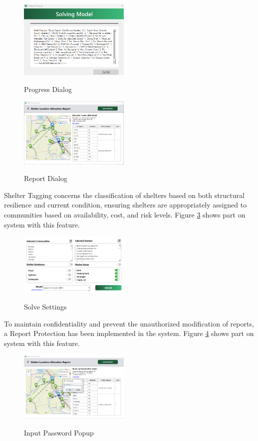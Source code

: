 \documentclass[12pt,a4paper,]{article}
\begin{document}
	\begin{figure}[h!]
		\caption{Progress Dialog}
		\centering
		\includegraphics[width=200px]{Chapter 4/progress}
		\label{solveProg}
	\end{figure}
	
	\begin{figure}[h!]
		\caption{Report Dialog}
		\centering
		\includegraphics[width=200px]{Chapter 4/alloc report}
		\label{shelAllocRep}
	\end{figure}
	
	Shelter Tagging concerns the classification of shelters based on both structural resilience and current condition, ensuring shelters are appropriately assigned to communities based on availability, cost, and risk levels. Figure \ref{solveSet} shows part on system with this feature.
	
	\begin{figure}[h!]
		\caption{Solve Settings}
		\centering
		\includegraphics[width=200px]{Chapter 4/solvesettings}
		\label{solveSet}
	\end{figure}
	
	To maintain confidentiality and prevent the unauthorized modification of reports, a Report Protection has been implemented in the system. Figure \ref{passPop} shows part on system with this feature.
	
	\begin{figure}[h!]
		\caption{Input Password Popup}
		\centering
		\includegraphics[width=200px]{Chapter 4/alloc report pass}
		\label{passPop}
	\end{figure}
	
\end{document}
